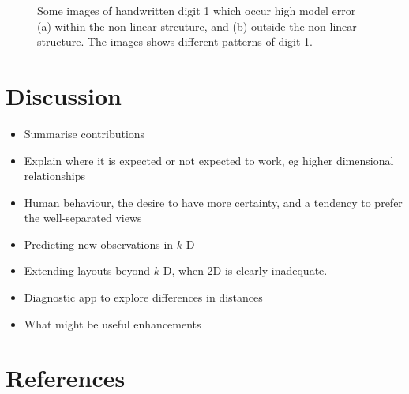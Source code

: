 \documentclass[
  12pt]{article}
\providecommand{\tightlist}{%
  \setlength{\itemsep}{0pt}\setlength{\parskip}{0pt}}\usepackage{longtable,booktabs,array}
\def\tightlist{}
\begin{document}
\begin{figure}[H]


\caption{\label{fig-mnist-anomalies}Some images of handwritten digit 1
which occur high model error (a) within the non-linear strcuture, and
(b) outside the non-linear structure. The images shows different
patterns of digit 1.}

\end{figure}%

\section{Discussion}\label{sec-discussion}

\begin{itemize}
\tightlist
\item
  Summarise contributions
\item
  Explain where it is expected or not expected to work, eg higher
  dimensional relationships
\item
  Human behaviour, the desire to have more certainty, and a tendency to
  prefer the well-separated views
\item
  Predicting new observations in \(k\)-D
\item
  Extending layouts beyond \(k\)-D, when 2D is clearly inadequate.
\item
  Diagnostic app to explore differences in distances
\item
  What might be useful enhancements
\end{itemize}

\section*{References}\label{references}

\renewcommand{\bibsection}{}


\newpage{}
\end{document}
